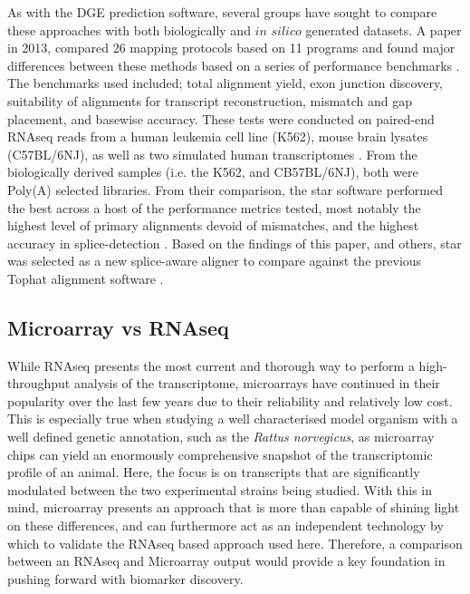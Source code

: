 As with the DGE prediction software, several groups have sought to compare these approaches with both biologically and $\textit{in silico}$ generated datasets. A paper in 2013, compared 26 mapping protocols based on 11 programs and found major differences between these methods based on a series of performance benchmarks \cite{Engstrom2013}. The benchmarks used included; total alignment yield, exon junction discovery, suitability of alignments for transcript reconstruction, mismatch and gap placement, and basewise accuracy. These tests were conducted on paired-end RNAseq reads from a human leukemia cell line (K562), mouse brain lysates (C57BL/6NJ), as well as two simulated human transcriptomes \cite{Djebali2012,Danecek2012,Grant2011}. From the biologically derived samples (i.e. the K562, and CB57BL/6NJ), both were Poly(A) selected libraries. From their comparison, the \acrfull{star} software performed the best across a host of the performance metrics tested, most notably the highest level of primary alignments devoid of mismatches, and the highest accuracy in splice-detection \cite{Dobin2012}. Based on the findings of this paper, and others, \acrshort{star} was selected as a new splice-aware aligner to compare against the previous Tophat alignment software \cite{Baruzzo2017,Raplee2019}. 

\subsection{Microarray vs RNAseq}

While RNAseq presents the most current and thorough way to perform a high-throughput analysis of the transcriptome, microarrays have continued in their popularity over the last few years due to their reliability and relatively low cost. This is especially true when studying a well characterised model organism with a well defined genetic annotation, such as the \textit{Rattus norvegicus}, as microarray chips can yield an enormously comprehensive snapshot of the transcriptomic profile of an animal. Here, the focus is on transcripts that are significantly modulated between the two experimental strains being studied. With this in mind, microarray presents an approach that is more than capable of shining light on these differences, and can furthermore act as an independent technology by which to validate the RNAseq based approach used here. Therefore, a comparison between an RNAseq and Microarray output would provide a key foundation in pushing forward with biomarker discovery.

